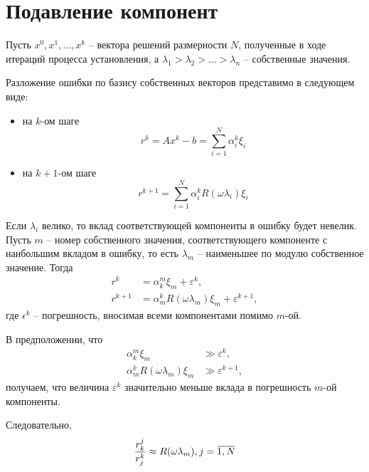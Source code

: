 \documentclass[a4paper,14pt]{extreport}
\begin{document}
  \section{Подавление компонент}
  \label{s:opress}
Пусть $x^0, x^1, \ldots, x^k$ -- вектора решений размерности $N$, полученные в ходе итераций процесса установления, а $\lambda_1 > \lambda_2 > \ldots > \lambda_n$ -- собственные значения.

Разложение ошибки по базису собственных векторов представимо в следующем виде: 
	\begin{itemize}
	  \item на $k$-ом шаге\hfill
	  	\begin{equation}\label{komp:nev1}
	  	 r^k=Ax^k - b=\sum_{i=1}^{N}\alpha_i^k\xi_i
	  	 \end{equation}
	  \item на $k+1$-ом шаге\hfill
	  	\begin{equation}\label{komp:nev2}
	  	r^{k+1}=\sum_{i=1}^{N}\alpha_i^kR(\omega\lambda_i)\xi_i
	  	\end{equation}
	\end{itemize}
	
Если $\lambda_i$ велико, то вклад соответствующей компоненты в ошибку будет невелик. Пусть $m$ -- номер собственного значения, соответствующего компоненте с наибольшим вкладом в ошибку, то есть $\lambda_m$ -- наименьшее по модулю собственное значение. Тогда
	\begin{equation}
	\label{komp:nev3}	
	\begin{aligned}
		r^k&=\alpha_k^m\xi_m + \varepsilon^k,\\
	    r^{k+1}&=\alpha_m^kR(\omega\lambda_m)\xi_m + \varepsilon^{k+1},
	 \end{aligned}
	\end{equation}
где $\epsilon^k$ -- погрешность, вносимая всеми компонентами помимо $m$-ой.

В предположении, что 
	\begin{equation}
	\label{komp:error1}	
	\begin{aligned}
		\alpha_k^m\xi_m &\gg \varepsilon^k,\\
	    \alpha_m^kR(\omega\lambda_m)\xi_m &\gg \varepsilon^{k+1},
	 \end{aligned}
	\end{equation}
получаем, что величина $\varepsilon^k$ значительно меньше вклада в погрешность $m$-ой компоненты. 

Следовательно,
	\begin{equation}
	\label{komp:nev_ratio}	
		\frac{r_k^j}{r_j^k} \approx R(\omega \lambda_m), j=\overbar{1, N}\\
	\end{equation}
\end{document}

